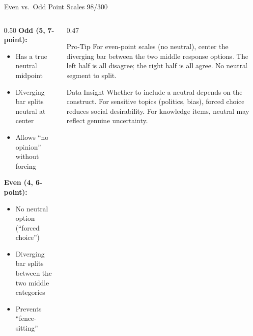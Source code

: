 \documentclass[10pt]{beamer}
\newcommand{\smark}[1]{\hfill{\scriptsize\color{codegray}#1}}
\begin{document}
\begin{frame}{Even vs.\ Odd Point Scales}
\smark{98/300}
\begin{columns}[T]
\begin{column}{0.50\textwidth}
    \textbf{Odd (5, 7-point):}
    \begin{itemize}
        \item Has a true neutral midpoint
        \item Diverging bar splits neutral at center
        \item Allows ``no opinion'' without forcing
    \end{itemize}
    \vspace{0.2cm}
    \textbf{Even (4, 6-point):}
    \begin{itemize}
        \item No neutral option (``forced choice'')
        \item Diverging bar splits between the two middle categories
        \item Prevents ``fence-sitting''
    \end{itemize}
\end{column}
\begin{column}{0.47\textwidth}
\begin{alertblock}{Pro-Tip}
    \scriptsize For even-point scales (no neutral), center the diverging bar between the two middle response options. The left half is all disagree; the right half is all agree. No neutral segment to split.
\end{alertblock}
\vspace{0.1cm}
\begin{exampleblock}{Data Insight}
    \scriptsize Whether to include a neutral depends on the construct. For sensitive topics (politics, bias), forced choice reduces social desirability. For knowledge items, neutral may reflect genuine uncertainty.
\end{exampleblock}
\end{column}
\end{columns}
\end{frame}
\end{document}
